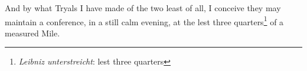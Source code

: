 \pstart [p.~3] And by what Tryals I have made of the two least of all, I conceive they may maintain a conference, in a still calm evening, at the lest three quarters\footnote{\textit{Leibniz unterstreicht}: lest three quarters} of a measured Mile.\pend